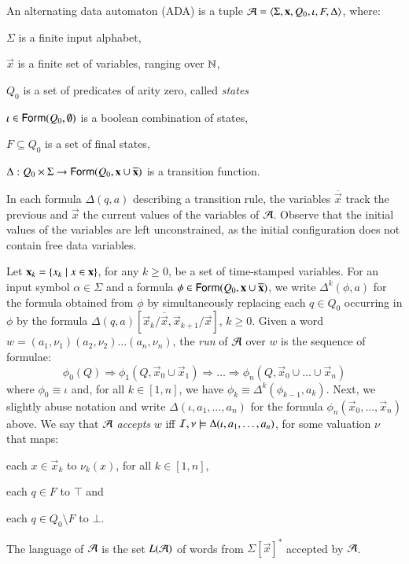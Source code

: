 \documentclass{llncs}
\begin{document}
\begin{definition}
  An alternating data automaton (ADA) is a tuple $\mathcal{A} =
  \left\langle \Sigma,\mathbf x,Q_0,\iota,F,\Delta \right\rangle$,
  where: \begin{compactitem}
    \item $\Sigma$ is a finite input alphabet,
    \item $\vec{x}$ is a finite set of variables, ranging over ${\bf \mathbb{N}}$,
    \item $Q_0$ is a set of predicates of arity zero, called \emph{states}
    \item $\iota \in \mathsf{Form}(Q_0,\emptyset)$ is a boolean combination of states,
    \item $F \subseteq Q_0$ is a set of final states,
    \item $\Delta : Q_0 \times \Sigma \rightarrow
      \mathsf{Form}(Q_0,\mathbf x\cup\overline{\mathbf x})$ is a transition function.
  \end{compactitem}
\end{definition}
In each formula $\Delta(q,a)$ describing a transition rule, the
variables $\overline{\vec{x}}$ track the previous and $\vec{x}$ the
current values of the variables of $\mathcal{A}$. Observe that the initial
values of the variables are left unconstrained, as the initial
configuration does not contain free data variables.

Let $\mathbf x_k = \left\{ x_k \mid x \in \mathbf x \right\}$, for any $k\geq0$, be a
set of time-stamped variables. For an input symbol $\alpha \in \Sigma$
and a formula $\phi \in \mathsf{Form}(Q_0,\mathbf x\cup\overline{\mathbf x})$, we
write $\Delta^k(\phi,a)$ for the formula obtained from $\phi$ by
simultaneously replacing each $q \in Q_0$ occurring in $\phi$ by the
formula
$\Delta(q,a)[\vec{x}_k/\overline{\vec{x}},\vec{x}_{k+1}/\vec{x}]$,
$k\geq0$. Given a word $w = (a_1,\nu_1)(a_2,\nu_2) \ldots
(a_n,\nu_n)$, the \emph{run} of $\mathcal{A}$ over $w$ is the sequence of
formulae: \[\phi_0(Q) \Rightarrow \phi_1(Q,\vec{x}_0 \cup \vec{x}_1)
\Rightarrow \ldots \Rightarrow \phi_n(Q,\vec{x}_0 \cup \ldots \cup
\vec{x}_n)\] where $\phi_0 \equiv \iota$ and, for all $k\in[1,n]$, we
have $\phi_k \equiv \Delta^k(\phi_{k-1},a_k)$. Next, we slightly abuse
notation and write $\Delta(\iota,a_1,\ldots,a_n)$ for the formula
$\phi_n(\vec{x}_0,\ldots,\vec{x}_n)$ above. We say that $\mathcal{A}$
\emph{accepts} $w$ iff $\mathcal{I},\nu \models \Delta(\iota,a_1,\ldots,a_n)$,
for some valuation $\nu$ that maps:\begin{compactitem}
%
\item each $x \in \vec{x}_k$ to $\nu_k(x)$, for all $k\in[1,n]$, 
%
\item each $q \in F$ to $\top$ and 
%
\item each $q \in Q_0 \setminus F$ to $\bot$.
\end{compactitem}
The language of $\mathcal{A}$ is the set $L(\mathcal{A})$ of words from
$\Sigma[\vec{x}]^*$ accepted by $\mathcal{A}$.
\end{document}
